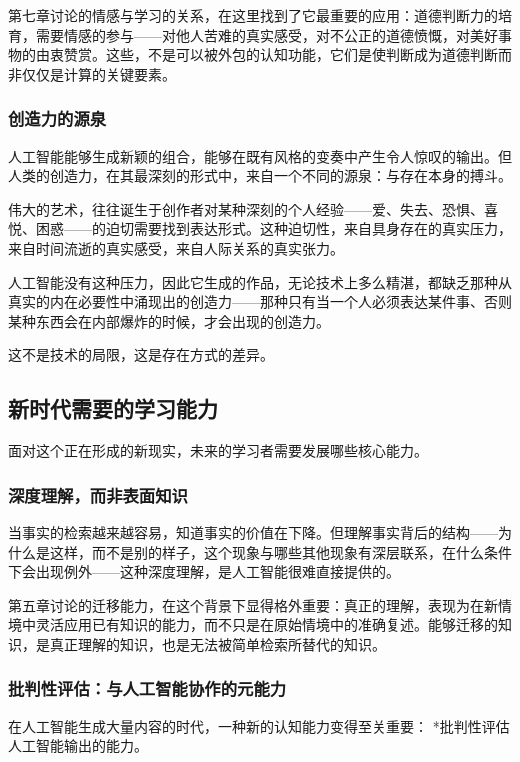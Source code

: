 \documentclass[11pt]{article}
\begin{document}
第七章讨论的情感与学习的关系，在这里找到了它最重要的应用：道德判断力的培育，需要情感的参与——对他人苦难的真实感受，对不公正的道德愤慨，对美好事物的由衷赞赏。这些，不是可以被外包的认知功能，它们是使判断成为道德判断而非仅仅是计算的关键要素。
\subsubsection{创造力的源泉}
\label{sec:org68dae68}

人工智能能够生成新颖的组合，能够在既有风格的变奏中产生令人惊叹的输出。但人类的创造力，在其最深刻的形式中，来自一个不同的源泉：与存在本身的搏斗。

伟大的艺术，往往诞生于创作者对某种深刻的个人经验——爱、失去、恐惧、喜悦、困惑——的迫切需要找到表达形式。这种迫切性，来自具身存在的真实压力，来自时间流逝的真实感受，来自人际关系的真实张力。

人工智能没有这种压力，因此它生成的作品，无论技术上多么精湛，都缺乏那种从真实的内在必要性中涌现出的创造力——那种只有当一个人必须表达某件事、否则某种东西会在内部爆炸的时候，才会出现的创造力。

这不是技术的局限，这是存在方式的差异。
\subsection{新时代需要的学习能力}
\label{sec:orgd5f1419}

面对这个正在形成的新现实，未来的学习者需要发展哪些核心能力。
\subsubsection{深度理解，而非表面知识}
\label{sec:org8ca446f}

当事实的检索越来越容易，知道事实的价值在下降。但理解事实背后的结构——为什么是这样，而不是别的样子，这个现象与哪些其他现象有深层联系，在什么条件下会出现例外——这种深度理解，是人工智能很难直接提供的。

第五章讨论的迁移能力，在这个背景下显得格外重要：真正的理解，表现为在新情境中灵活应用已有知识的能力，而不只是在原始情境中的准确复述。能够迁移的知识，是真正理解的知识，也是无法被简单检索所替代的知识。
\subsubsection{批判性评估：与人工智能协作的元能力}
\label{sec:orgfe335d5}

在人工智能生成大量内容的时代，一种新的认知能力变得至关重要： *批判性评估人工智能输出的能力。
\end{document}

